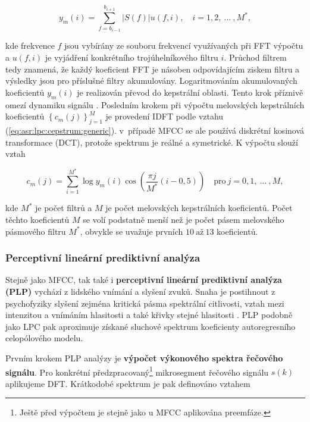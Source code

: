 \begin{equation}
  y_m(i) = \sum_{f=b_{i-1}}^{b_{i+1}} \left| S(f) \right| u\left(f, i\right),  \quad i = 1, 2,\ \dots\ ,M^{*},
  \label{eq:asr:mfcc:freq:responce}
\end{equation}

\noindent kde frekvence $f$ jsou vybírány ze souboru frekvencí využívaných při FFT výpočtu a $u(f, i)$ je vyjádření konkrétního trojúhelníkového filtru $i$. Průchod filtrem tedy znamená, že každý koeficient FFT je násoben odpovídajícím ziskem filtru a výsledky jsou pro příslušné filtry akumulovány. Logaritmováním akumulovaných koeficientů $y_{m}(i)$ je realizován převod do kepstrální oblasti. Tento krok příznivě omezí dynamiku signálu \cite{Benesty2007}. Posledním krokem při výpočtu melovských kepstrálních koeficientů $\left\{c_m\left(j\right)\right\}_{j=1}^{M}$ je provedení IDFT podle vztahu (\ref{eq:asr:lpc:cepstrum:generic}). v~případě MFCC se ale používá diskrétní kosinová transformace (DCT), protože spektrum je reálné a symetrické. K výpočtu slouží vztah

\begin{equation}
  c_{m}(j) = \sum_{i=1}^{M^{*}} \log y_m(i) \cos\left( \frac{\pi j}{M^{*}}\left(i - 0,5\right) \right) \quad \text{pro}\ j = 0, 1,\ \dots\ ,M,
  \label{eq:asr:mfcc:coef}
\end{equation}

\noindent kde $M^{*}$ je počet filtrů a $M$ je počet melovských kepstrálních koeficientů. Počet těchto koeficientů $M$ se volí podstatně menší než je počet pásem melovského pásmového filtru $M^{*}$, obvykle se uvažuje prvních $10\ \text{až}\ 13$ koeficientů.

\subsubsection{Perceptivní lineární prediktivní analýza}

Stejně jako MFCC, tak také i \textbf{perceptivní lineární prediktivní analýza (PLP)} vychází z lidského vnímání a slyšení zvuků. Snaha je postihnout z psychofyziky slyšení zejména kritická pásma spektrální citlivosti, vztah mezi intenzitou a vnímáním hlasitosti a také křivky stejné hlasitosti \cite{Psutka2006}. PLP podobně jako LPC pak aproximuje získané sluchové spektrum koeficienty autoregresního celopólového modelu.

Prvním krokem PLP analýzy je \textbf{výpočet výkonového spektra řečového signálu}. Pro konkrétní předzpracovaný\footnote{Ještě před výpočtem je stejně jako u MFCC aplikována preemfáze.} mikrosegment řečového signálu $s(k)$ aplikujeme DFT. Krátkodobé spektrum je pak definováno vztahem

